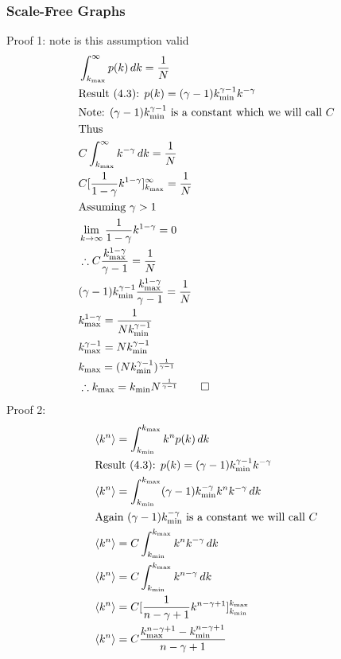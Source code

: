 \documentclass{article}
\begin{document}
            \subsubsection{Scale-Free Graphs}
            Proof 1: note is this assumption valid
            \begin{align*}
                &\int_{k_{\text{max}}}^{\infty} p(k) \,dk = \frac{1}{N}\\
                &\text{Result (4.3): } p(k) = (\gamma -1)k^{\gamma-1}_{\text{min}}k^{-\gamma}\\
                &\text{Note: $(\gamma -1)k^{\gamma-1}_{\text{min}}$ is a constant which we will call $C$}\\
                &\text{Thus}\\
                &C\int_{k_{\text{max}}}^{\infty}k^{-\gamma} \,dk  = \frac{1}{N}\\
                &C[\frac{1}{1-\gamma}k^{1-\gamma}]^{\infty}_{k_{\text{max}}} = \frac{1}{N}\\
                &\text{Assuming $\gamma>1$}\\
                &\lim_{k \to \infty} \frac{1}{1-\gamma}k^{1-\gamma}= 0\\
                &\therefore C\frac{{k^{1-\gamma}_{\text{max}}}}{\gamma -1} = \frac{1}{N}\\
                &(\gamma-1)k^{\gamma-1}_{\text{min}}\frac{{k^{1-\gamma}_{\text{max}}}}{\gamma -1} = \frac{1}{N}\\
                &k^{1-\gamma}_{\text{max}} = \frac{1}{Nk^{\gamma-1}_{\text{min}}}\\
                &k^{\gamma -1}_{\text{max}} = Nk^{\gamma-1}_{\text{min}}\\
                &k_{\text{max}} = (Nk^{\gamma-1}_{\text{min}})^{\frac{1}{\gamma-1}}\\
                &\therefore k_{\text{max}} = k_{\text{min}}N^{\frac{1}{\gamma-1}} \qed
            \end{align*}
            Proof 2:
            \begin{align*}
                &\langle k^n \rangle = \int_{k_{\text{min}}}^{k_{\text{max}}}k^{n}p(k) \,dk\\
                &\text{Result (4.3): } p(k) = (\gamma -1)k^{\gamma-1}_{\text{min}}k^{-\gamma}\\
                &\langle k^n \rangle = \int_{k_{\text{min}}}^{k_{\text{max}}} (\gamma-1)k^{-\gamma}_{\text{min}}k^{n}k^{-\gamma} \,dk \\
                &\text{Again $ (\gamma-1)k^{-\gamma}_{\text{min}}$ is a constant we will call $C$}\\
                &\langle k^n \rangle = C\int_{k_{\text{min}}}^{k_{\text{max}}}k^{n}k^{-\gamma} \,dk\\ 
                &\langle k^n \rangle = C\int_{k_{\text{min}}}^{k_{\text{max}}}k^{n-\gamma} \,dk\\
                &\langle k^n \rangle = C[\frac{1}{n-\gamma +1}k^{n-\gamma+1}]^{k_{\text{max}}}_{k_{\text{min}}}\\
                &\langle k^n \rangle = C\frac{k_{\text{max}}^{n-\gamma+1} -k_{\text{min}}^{n-\gamma+1}}{n-\gamma +1 }
            \end{align*}
\end{document}
